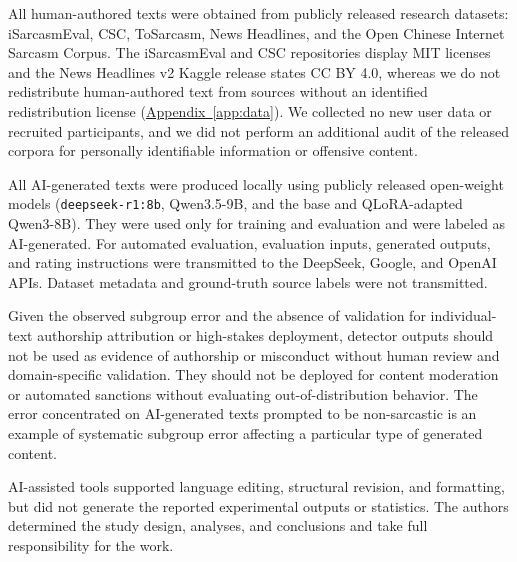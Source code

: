 \documentclass[11pt]{article}
\newcommand{\Appref}[1]{\hyperref[#1]{Appendix~\ref*{#1}}}
\begin{document}
All human-authored texts were obtained from publicly released research datasets: iSarcasmEval, CSC, ToSarcasm, News Headlines, and the Open Chinese Internet Sarcasm Corpus. The iSarcasmEval and CSC repositories display MIT licenses and the News Headlines v2 Kaggle release states CC BY 4.0, whereas we do not redistribute human-authored text from sources without an identified redistribution license (\Appref{app:data}). We collected no new user data or recruited participants, and we did not perform an additional audit of the released corpora for personally identifiable information or offensive content.

All AI-generated texts were produced locally using publicly released open-weight models (\texttt{deepseek-r1:8b}, Qwen3.5-9B, and the base and QLoRA-adapted Qwen3-8B). They were used only for training and evaluation and were labeled as AI-generated. For automated evaluation, evaluation inputs, generated outputs, and rating instructions were transmitted to the DeepSeek, Google, and OpenAI APIs. Dataset metadata and ground-truth source labels were not transmitted.

Given the observed subgroup error and the absence of validation for individual-text authorship attribution or high-stakes deployment, detector outputs should not be used as evidence of authorship or misconduct without human review and domain-specific validation. They should not be deployed for content moderation or automated sanctions without evaluating out-of-distribution behavior. The error concentrated on AI-generated texts prompted to be non-sarcastic is an example of systematic subgroup error affecting a particular type of generated content.

AI-assisted tools supported language editing, structural revision, and formatting, but did not generate the reported experimental outputs or statistics. The authors determined the study design, analyses, and conclusions and take full responsibility for the work.



\appendix


\end{document}
